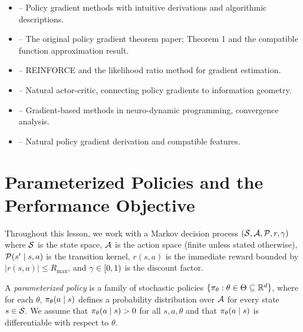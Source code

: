 \documentclass[11pt,a4paper]{article}
\begin{document}
\begin{itemize}
  \item \citet[Chapter 13]{suttonbarto2018} -- Policy gradient methods
    with intuitive derivations and algorithmic descriptions.
  \item \citet{sutton2000} -- The original policy gradient theorem paper;
    Theorem 1 and the compatible function approximation result.
  \item \citet{williams1992} -- REINFORCE and the likelihood ratio method
    for gradient estimation.
  \item \citet{peters2008} -- Natural actor-critic, connecting policy
    gradients to information geometry.
  \item \citet[Chapter 6]{bertsekas1996} -- Gradient-based methods in
    neuro-dynamic programming, convergence analysis.
  \item \citet{kakade2002} -- Natural policy gradient derivation and
    compatible features.
\end{itemize}

\section{Parameterized Policies and the Performance Objective}

Throughout this lesson, we work with a Markov decision process
$(\mathcal{S}, \mathcal{A}, \mathcal{P}, r, \gamma)$ where $\mathcal{S}$ is the state
space, $\mathcal{A}$ is the action space (finite unless stated otherwise),
$\mathcal{P}(s' \mid s, a)$ is the transition kernel, $r(s,a)$ is the
immediate reward bounded by $|r(s,a)| \leq R_{\max}$, and
$\gamma \in [0,1)$ is the discount factor.

\begin{definition}
\label{def:param-policy}
A \emph{parameterized policy} is a family of stochastic policies
$\{\pi_\theta : \theta \in \Theta \subseteq \mathbb{R}^d\}$, where for each
$\theta$, $\pi_\theta(a \mid s)$ defines a probability distribution
over $\mathcal{A}$ for every state $s \in \mathcal{S}$. We assume that
$\pi_\theta(a \mid s) > 0$ for all $s, a, \theta$ and that
$\pi_\theta(a \mid s)$ is differentiable with respect to $\theta$.
\end{definition}
\end{document}
